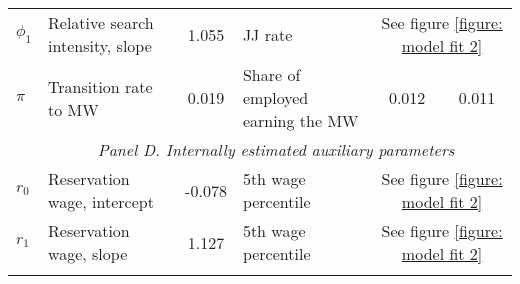 \begin{tabular}{l l c l c c}
$\phi_1$ & Relative search intensity, slope & 1.055 & JJ rate & \multicolumn{2}{c}{See figure \ref{figure: model fit 2}} \\ 
$\pi$ & Transition rate to MW & 0.019 & Share of employed earning the MW & 0.012 & 0.011 \\ 
\addlinespace[1.5ex] 
& \multicolumn{5}{c}{\textit{Panel D. Internally estimated auxiliary parameters}} \\ \cline{2-6} \addlinespace[1ex] 
$r_0$ & Reservation wage, intercept & -0.078 & 5th wage percentile & \multicolumn{2}{c}{See figure \ref{figure: model fit 2}} \\ 
$r_1$ & Reservation wage, slope & 1.127 & 5th wage percentile & \multicolumn{2}{c}{See figure \ref{figure: model fit 2}} \\ 
\addlinespace[.5ex] \hline 
\end{tabular}